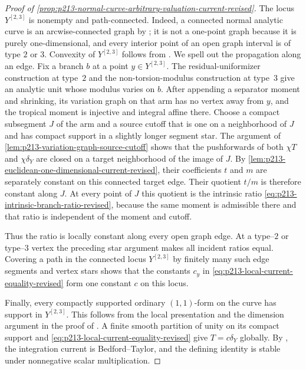 \begin{proof}[Proof of
\cref{prop:p213-normal-curve-arbitrary-valuation-current-revised}]
The locus $Y^{[2,3]}$ is nonempty and path-connected.  Indeed, a connected
normal analytic curve is an arcwise-connected graph by
\cite[Theorem~3.5.1 and \S1.3.5]{Ducros24CurveStructure}; it is not a
one-point graph because it is purely one-dimensional, and every interior
point of an open graph interval is of type $2$ or $3$.  Convexity of
$Y^{[2,3]}$ follows from \cite[\S4.5.11]{Ducros24CurveStructure}.
We spell out the propagation along an edge.  Fix a branch $b$ at a point
$y\in Y^{[2,3]}$.  The residual-uniformizer construction at type~$2$ and
the non-torsion-modulus construction at type~$3$ give an analytic unit
whose modulus varies on $b$.  After appending a separator moment and
shrinking, its variation graph on that arm has no vertex away from $y$,
and the tropical moment is injective and integral affine there.  Choose a
compact subsegment $J$ of the arm and a source cutoff that is one on a
neighborhood of $J$ and has compact support in a slightly longer segment
star.  The argument of
\cref{lem:p213-variation-graph-source-cutoff} shows that the pushforwards
of both $\chi T$ and $\chi\delta_Y$ are closed on a target neighborhood of
the image of $J$.  By
\cref{lem:p213-euclidean-one-dimensional-current-revised}, their
coefficients $t$ and $m$ are separately constant on this connected target
edge.  Their quotient $t/m$ is therefore constant along $J$.  At every
point of $J$ this quotient is the intrinsic ratio
\eqref{eq:p213-intrinsic-branch-ratio-revised}, because the same moment is
admissible there and that ratio is independent of the moment and cutoff.

Thus the ratio is locally constant along every open graph edge.  At a
type--$2$ or type--$3$ vertex the preceding star argument makes all
incident ratios equal.  Covering a path in the connected locus
$Y^{[2,3]}$ by finitely many such edge segments and vertex stars shows
that the constants $c_y$ in
\eqref{eq:p213-local-current-equality-revised} form one constant $c$ on
this locus.

Finally, every compactly supported ordinary $(1,1)$-form on the curve has
support in $Y^{[2,3]}$.  This follows from the local presentation
\cite[Proposition~15.1.1(b)]{CLD25} and the dimension argument in the
proof of \cite[Proposition~15.2.1(a)]{CLD25}.  A finite smooth partition
of unity on its compact support and
\eqref{eq:p213-local-current-equality-revised} give
$T=c\delta_Y$ globally.  By \cite[Example~8.6.4]{CLD25}, the integration
current is Bedford--Taylor, and the defining identity is stable under
nonnegative scalar multiplication.
\end{proof}


